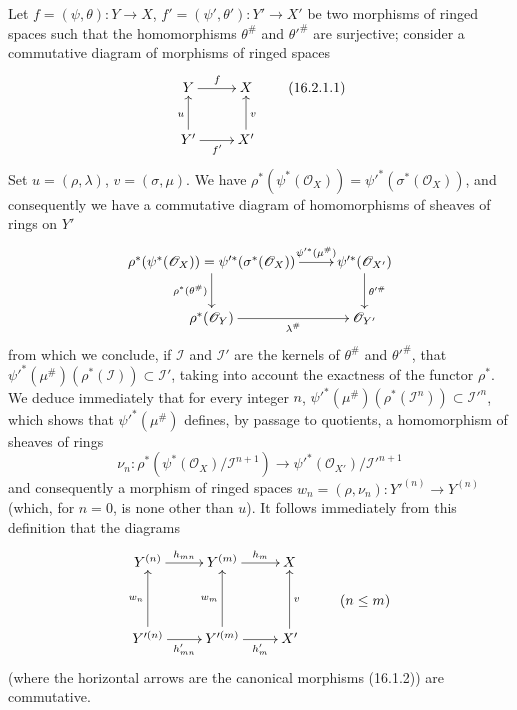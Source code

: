 \begin{env}[16.2.1]
\label{IV.16.2.1}
Let $f=(\psi,\theta):Y\to X$,
$f'=(\psi',\theta'):Y'\to X'$ be two morphisms of ringed spaces such that the
homomorphisms $\theta^\#$ and $\theta'^\#$ are surjective; consider a
commutative diagram of morphisms of ringed spaces
\[
  \xymatrix{
    Y \ar[r]^f & X \\
    Y' \ar[r]_{f'} \ar[u]^u & X' \ar[u]_v
  }
  \tag{16.2.1.1}
  \label{IV.16.2.1.1}
\]
Set $u=(\rho,\lambda)$, $v=(\sigma,\mu)$. We have
$\rho^*(\psi^*(\mathcal{O}_X))=
\psi'^*(\sigma^*(\mathcal{O}_X))$, and consequently we have a commutative diagram
of homomorphisms of sheaves of rings on $Y'$
\[
  \xymatrix{
    \rho^*(\psi^*(\mathcal{O}_X))
      =\psi'^*(\sigma^*(\mathcal{O}_X))
      \ar[r]^-{\psi'^*(\mu^\#)}
      \ar[d]_{\rho^*(\theta^\#)}
      & \psi'^*(\mathcal{O}_{X'}) \ar[d]^{\theta'^\#} \\
    \rho^*(\mathcal{O}_Y) \ar[r]_-{\lambda^\#}
      & \mathcal{O}_{Y'}
  }
\]
from which we conclude, if $\mathscr{I}$ and $\mathscr{I}'$ are the kernels of
$\theta^\#$ and $\theta'^\#$, that
$\psi'^*(\mu^\#)(\rho^*(\mathscr{I}))\subset\mathscr{I}'$, taking into account
the exactness of the functor $\rho^*$. We deduce immediately that for every integer
$n$,
$\psi'^*(\mu^\#)(\rho^*(\mathscr{I}^n))\subset\mathscr{I}'^n$, which shows
that $\psi'^*(\mu^\#)$ defines, by passage to quotients, a homomorphism of
sheaves of rings
\[
  \nu_n:
  \rho^*(\psi^*(\mathcal{O}_X)/\mathscr{I}^{n+1})
  \longrightarrow
  \psi'^*(\mathcal{O}_{X'})/\mathscr{I}'^{n+1}
  \tag{16.2.1.2}
  \label{IV.16.2.1.2}
\]
and consequently a morphism of ringed spaces
$w_n=(\rho,\nu_n):Y'^{(n)}\to Y^{(n)}$ (which, for $n=0$, is none other than
$u$). It follows immediately from this definition that the diagrams
\[
  \xymatrix@R=1pc{
    Y^{(n)} \ar[r]^-{h_{mn}} & Y^{(m)} \ar[r]^-{h_m} & X \\
    & & & (n\leq m) \\
    Y'^{(n)} \ar[r]_-{h'_{mn}} \ar[uu]^-{w_n}
      & Y'^{(m)} \ar[r]_-{h'_m} \ar[uu]^-{w_m}
      & X' \ar[uu]_-v
  }
\]
(where the horizontal arrows are the canonical morphisms (16.1.2)) are
commutative.


\end{env}
